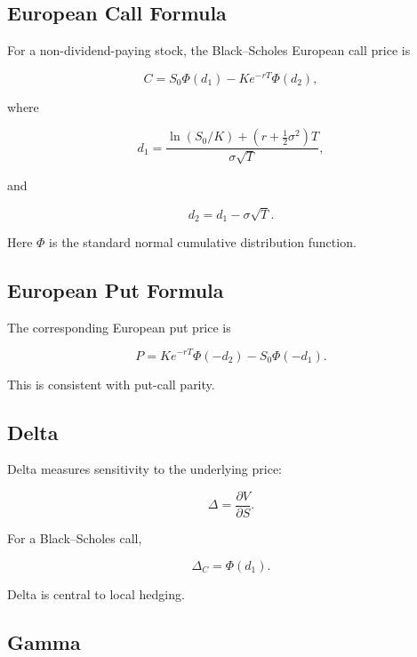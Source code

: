 \subsection{European Call Formula}
\label{subsec:black-scholes-call-formula}

For a non-dividend-paying stock, the Black--Scholes European call price is

\[
\boxed{
C
=
S_0\Phi(d_1)
-
Ke^{-rT}\Phi(d_2),
}
\]

where

\[
\boxed{
d_1
=
\frac{
\ln(S_0/K)
+
(r+\frac12\sigma^2)T
}{
\sigma\sqrt{T}
},
}
\]

and

\[
\boxed{
d_2
=
d_1-\sigma\sqrt{T}.
}
\]

Here \(\Phi\) is the standard normal cumulative distribution function.

\subsection{European Put Formula}
\label{subsec:black-scholes-put-formula}

The corresponding European put price is

\[
\boxed{
P
=
Ke^{-rT}
\Phi(-d_2)
-
S_0\Phi(-d_1).
}
\]

This is consistent with put-call parity.

\subsection{Delta}
\label{subsec:option-delta}

Delta measures sensitivity to the underlying price:

\[
\boxed{
\Delta
=
\frac{\partial V}{\partial S}.
}
\]

For a Black--Scholes call,

\[
\boxed{
\Delta_C
=
\Phi(d_1).
}
\]

Delta is central to local hedging.

\subsection{Gamma}
\label{subsec:option-gamma}

